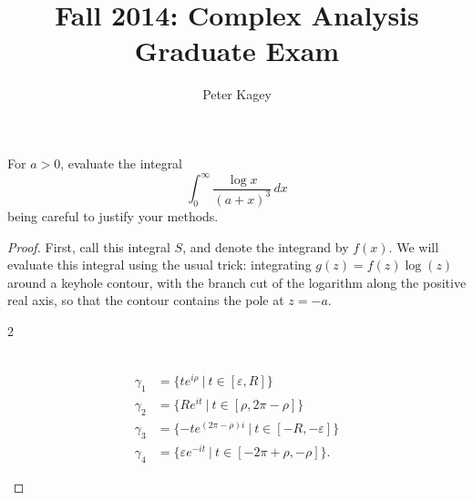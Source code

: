 \documentclass{article}
\newenvironment{problem}[2][Problem]{\begin{trivlist}
\item[\hskip \labelsep {\bfseries #1}\hskip \labelsep {\bfseries #2.}]}{\end{trivlist}}
\begin{document}
\title{Fall 2014: Complex Analysis Graduate Exam}
\author{Peter Kagey}

\maketitle

\begin{problem}{1}
  For $a > 0$, evaluate the integral \[
    \int_0^\infty \frac{\log x}{(a + x)^3}\, dx
  \] being careful to justify your methods.
\end{problem}

\begin{proof}
  First, call this integral $S$, and denote the integrand by $f(x)$.
  We will evaluate this integral using the usual trick: integrating
  $g(z) = f(z)\log(z)$ around a keyhole contour, with the branch cut of
  the logarithm along the positive real axis, so that the contour contains the
  pole at $z = -a$.

  \begin{multicols}{2}
  \\
  \begin{align}
    \gamma_{1} &= \{te^{i\rho}\ |\ t \in [\varepsilon, R] \} \\
    \gamma_{2} &= \{R e^{it}\ |\ t \in [\rho,2\pi-\rho] \} \\
    \gamma_{3} &= \{-te^{(2\pi -\rho)i}\ |\ t \in [-R, -\varepsilon]\} \\
    \gamma_{4} &= \{\varepsilon e^{-it}\ |\ t \in [-2\pi + \rho, -\rho]\}.
  \end{align}
  \end{multicols}


\end{proof}
\end{document}
